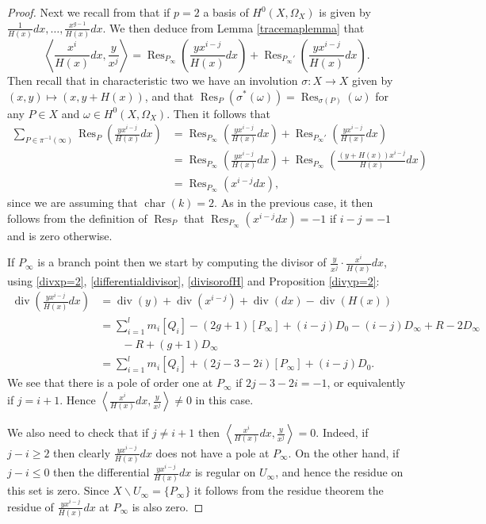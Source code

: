 \documentclass[11pt]{article} %
\theoremstyle{plain}
\theoremstyle{remark}
\newcommand{\ra}{\rightarrow}
\newcommand{\hzero}{{H^0(X,\Omega_X)}}
\DeclareMathOperator{\res}{Res}
\DeclareMathOperator{\di}{div}
\DeclareMathOperator{\cha}{char}
\begin{document}
\begin{proof}
Next we recall from \cite[Chap 7, Prop. 4.26]{liu} that if $p=2$ a basis of $\hzero$ is given by $\frac{1}{H(x)}dx, \ldots, \frac{x^{g-1}}{H(x)}dx$.
We then deduce from Lemma \ref{tracemaplemma} that
\[
\left \langle \frac{x^i}{H(x)}dx, \frac{y}{x^j} \right \rangle = \res_{P_\infty} \left( \frac{yx^{i-j}}{H(x)}dx \right) + \res_{P_\infty'}\left( \frac{yx^{i-j}}{H(x)} dx \right).
\]
Then recall that in characteristic two we have an involution $\sigma \colon X \ra X$ given by $(x,y) \mapsto (x, y + H(x))$, and that $\res_P(\sigma^*(\omega)) = \res_{\sigma(P)}(\omega)$ for any $P \in X$ and $\omega\in \hzero$.
Then it follows that
\begin{align*}
\sum_{P \in \pi^{-1}(\infty)} \res_P \left( \frac{yx^{i-j}}{H(x)}dx \right) & = \res_{P_\infty} \left( \frac{yx^{i-j}}{H(x)} dx \right) + \res_{P_\infty'}\left( \frac{yx^{i-j}}{H(x)} dx\right) \\
& = \res_{P_ \infty} \left( \frac{yx^{i-j}}{H(x)}dx \right) + \res_{P_ \infty} \left( \frac{(y+H(x))x^{i-j}}{H(x)}dx \right) \\
& = \res_{P_\infty}(x^{i-j}dx),
\end{align*}
since we are assuming that $\cha(k) = 2$.
As in the previous case, it then follows from the definition of $\res_P$ that $\res_{P_\infty}(x^{i-j}dx) = -1$ if $i-j = -1$ and is zero otherwise.



If $P_\infty$ is a branch point then we start by computing the divisor of $ \frac{y}{x^j} \cdot \frac{x^i}{H(x)}dx$, using \eqref{divxp=2}, \eqref{differentialdivisor}, \eqref{divisorofH} and Proposition \ref{divyp=2}:
\begin{align*}
\di\left( \frac{yx^{i-j}}{H(x)}dx \right) & = \di(y) + \di(x^{i-j}) + \di( dx) - \di(H(x)) \\
& = \sum_{i=1}^l m_i[Q_i] - (2g+ 1 )[P_\infty] + (i-j)D_0 - (i-j)D_\infty + R - 2D_\infty \\
& \qquad - R + (g+1)D_\infty\\
& = \sum_{i=1}^l m_i[Q_i] + (2j-3-2i)[P_\infty] + (i-j)D_0.
\end{align*}
We see that there is a pole of order one at $P_\infty$ if $2j - 3 - 2i = -1$, or equivalently if $j = i+1$.
Hence $\left\langle \frac{x^i}{H(x)}dx, \frac{y}{x^j} \right\rangle \neq 0$ in this case.

We also need to check that if $j \neq i+1$ then $\left \langle \frac{x^i}{H(x)}dx, \frac{y}{x^j} \right \rangle = 0$.
Indeed, if $j-i \geq 2$ then clearly $\frac{yx^{i-j}}{H(x)}dx$ does not have a pole at $P_\infty$.
On the other hand, if $j-i \leq 0$ then the differential $\frac{yx^{i-j}}{H(x)}dx$ is regular on $U_\infty$, and hence the residue on this set is zero.
Since $X \backslash U_\infty = \{P_\infty\}$ it follows from the residue theorem the residue of $\frac{yx^{i-j}}{H(x)}dx$ at $P_\infty$ is also zero.
\end{proof}
\end{document}
